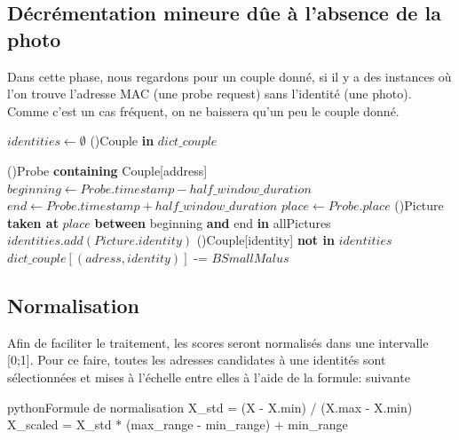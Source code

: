 \subsection{Décrémentation mineure dûe à l'absence de la photo}
Dans cette phase, nous regardons pour un couple donné, si il y a des instances où l'on trouve 
l'adresse MAC (une probe request) sans l'identité (une photo). Comme c'est un cas fréquent, on ne baissera qu'un peu le couple donné. 


\begin{algorithm2e}[H]
	\SetAlgoLined
	$identities  \gets \emptyset $\;
	\ForEach(){Couple \textbf{in} $dict\_couple$}{
		 \ForEach(){Probe \textbf{containing} Couple[address]}{
			$beginning \gets Probe.timestamp - half\_window\_duration$\;
			$end \gets Probe.timestamp + half\_window\_duration$\;
			$place \gets Probe.place$\; 
			\ForEach(){Picture \textbf{taken at} $place$ \textbf{between} beginning \textbf{and} end \textbf{in} allPictures}{
				$identities.add(Picture.identity)$
			 }
			}
		\If(){Couple[identity] \textbf{not in} $identities$}{
			$dict\_couple[(adress, identity)]$ -= $BSmallMalus$\;
		}

		}
	\caption{Décrémentation mineure dûe à l'absence de la photo}
\end{algorithm2e}

\subsection{Normalisation~\cite{SKLEARNMINMAX}}
Afin de faciliter le traitement, les scores seront normalisés dans une intervalle [0;1].
Pour ce faire, toutes les adresses candidates à une identités sont sélectionnées et mises à l'échelle entre elles à l'aide de la formule: suivante

\begin{listingsbox}{python}{Formule de normalisation}
X_std = (X - X.min) / (X.max - X.min)
X_scaled = X_std * (max_range - min_range) + min_range
\end{listingsbox}